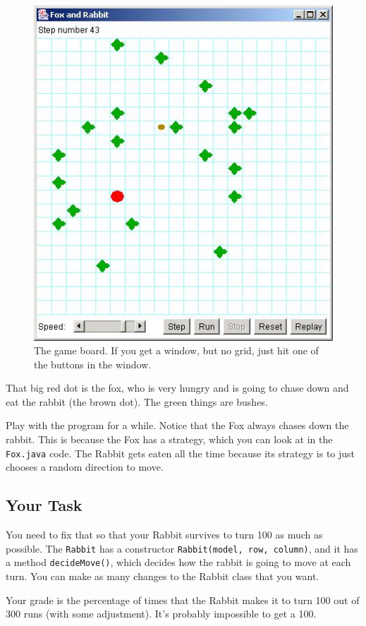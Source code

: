 \documentclass[10pt,letterpaper]{article}
\begin{document}
	
	\begin{figure}[h!]
		\centering
		\includegraphics[width=0.7\linewidth]{hunt}
		\caption{The game board. If you get a window, but no grid, just hit one of the buttons in the window.}
		\label{fig:hunt}
	\end{figure}


	
	That big red dot is the fox, who is very hungry and is going to chase down and eat the rabbit (the brown dot).
	The green things are bushes.
	
	Play with the program for a while.
	Notice that the Fox always chases down the rabbit.
	This is because the Fox has a strategy, which you can look at in the \texttt{Fox.java} code.
	The Rabbit gets eaten all the time because its strategy is to just chooses a random direction to move.
	\newpage
	
	\subsection{Your Task}
	You need to fix that so that your Rabbit survives to turn 100 as much as possible.
	The \texttt{Rabbit} has a constructor \texttt{Rabbit(model, row, column)}, and it has a method \texttt{decideMove()}, which decides how the rabbit is going to move at each turn. 
	You can make as many changes to the Rabbit class that you want.
	
	Your grade is the percentage of times that the Rabbit makes it to turn 100 out of 300 runs (with some adjustment).
	It's probably impossible to get a 100.
	
\end{document}
